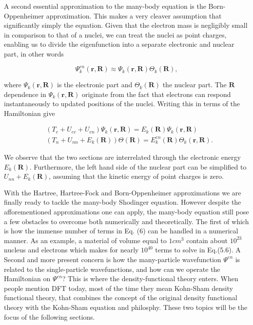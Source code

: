 A second essential approximation to the many-body equation is the Born-Oppenheimer approximation. This makes a very cleaver assumption that significantly simply the equation. Given that the electron mass is negligibly small in comparison to that of a nuclei, we can treat the nuclei as point charges, enabling us to divide the eigenfunction into a separate electronic and nuclear part, in other words

\begin{equation}
    \Psi_{k}^{en}(\boldsymbol{r}, \boldsymbol{R}) \approx \Psi_k(\boldsymbol{r}, \boldsymbol{R}) \Theta_k(\boldsymbol{R}),
\end{equation}

where $\Psi_k(\boldsymbol{r}, \boldsymbol{R})$ is the electronic part and $\Theta_k(\boldsymbol{R})$ the nuclear part. The $\boldsymbol{R}$ dependence in $\Psi_k(\boldsymbol{r}, \boldsymbol{R})$ originate from the fact that electrons can respond instantaneously to updated positions of the nuclei. Writing this in terms of the Hamiltonian give

\begin{align}
    &\left( T_{e} + U_{ee} + U_{en} \right) \Psi_k(\boldsymbol{r}, \boldsymbol{R}) = E_k(\boldsymbol{R})\Psi_k(\boldsymbol{r}, \boldsymbol{R}) \\
    &\left( T_{n} + U_{nn} + E_k(\boldsymbol{R}) \right) \Theta(\boldsymbol{R}) = E_{k}^{en}(\boldsymbol{R})\Theta_k(\boldsymbol{r}, \boldsymbol{R}).
\end{align}

We observe that the two sections are interrelated through the electronic energy $E_k(\boldsymbol{R})$. Furthermore, the left hand side of the nuclear part can be simplified to $U_{nn} + E_k(\boldsymbol{R})$, assuming that the kinetic energy of point charges is zero.

With the Hartree, Hartree-Fock and Born-Oppenheimer approximations we are finally ready to tackle the many-body Shodinger equation. However despite the afforementioned approximations one can apply, the many-body equation still pose a few obstacles to overcome both numerically and theoretically. The first of which is how the immense number of terms in Eq. (6) can be handled in a numerical manner. As an example, a material of volume equal to $1cm^3$ contain about $10^{23}$ nucleus and electrons which makes for nearly $10^{40}$ terms to solve in Eq.(5.6). A Second and more present concern is how the many-particle wavefunction $\Psi^{en}$ is related to the single-particle wavefunctions, and how can we operate the Hamiltonian on $\Psi^{en}$? This is where the density-functional theory enters. When people mention DFT today, most of the time they mean Kohn-Sham density functional theory, that combines the concept of the original density functional theory with the Kohn-Sham equation and philosphy. These two topics will be the focus of the following sections.

